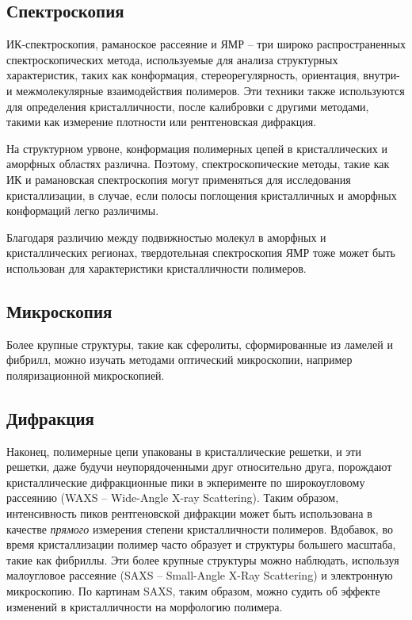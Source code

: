 \subsection{Спектроскопия}
ИК-спектроскопия, раманоское рассеяние и ЯМР -- три широко распространенных спектроскопических метода, используемые для анализа структурных характеристик, таких как конформация, стереорегулярность, ориентация, внутри- и межмолекулярные взаимодействия полимеров. Эти техники также используются для определения кристалличности, после калибровки с другими методами, такими как измерение плотности или рентгеновская дифракция.

На структурном урвоне, конформация полимерных цепей в кристаллических и аморфных областях различна. Поэтому, спектроскопические методы, такие как ИК и рамановская спектроскопия могут применяться для исследования кристаллизации, в случае, если полосы поглощения кристалличных и аморфных конформаций легко различимы.

Благодаря различию между подвижностью молекул в аморфных и кристаллических регионах, твердотельная спектроскопия ЯМР тоже может быть использован для характеристики кристалличности полимеров.


\subsection{Микроскопия}
Более крупные структуры, такие как сферолиты, сформированные из ламелей и фибрилл, можно изучать методами оптический микроскопии, например поляризационной микроскопией.


\subsection{Дифракция}

Наконец, полимерные цепи упакованы в кристаллические решетки, и эти решетки, даже будучи неупорядоченными друг относительно друга, порождают кристаллические дифракционные пики в экперименте по широкоугловому рассеянию (WAXS -- Wide-Angle X-ray Scattering). Таким образом, интенсивность пиков рентгеновской дифракции может быть использована в качестве \textit{прямого} измерения степени кристалличности полимеров. Вдобавок, во время кристаллизации полимер часто образует и структуры большего масштаба, такие как  фибриллы. Эти более крупные структуры можно наблюдать, используя малоугловое рассеяние (SAXS -- Small-Angle X-Ray Scattering) и электронную микроскопию. По картинам SAXS, таким образом, можно судить об эффекте изменений в кристалличности на морфологию полимера.


